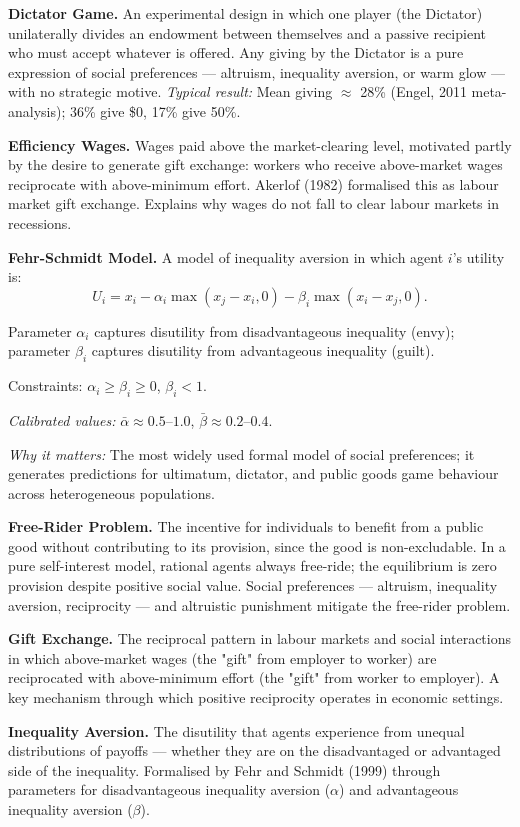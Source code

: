 \documentclass[12pt, letterpaper]{article}
\begin{document}
\textbf{Dictator Game.} An experimental design in which one player (the Dictator) unilaterally divides an endowment between themselves and a passive recipient who must accept whatever is offered. Any giving by the Dictator is a pure expression of social preferences --- altruism, inequality aversion, or warm glow --- with no strategic motive. \textit{Typical result:} Mean giving $\approx$ 28\% (Engel, 2011 meta-analysis); 36\% give \$0, 17\% give 50\%.

\textbf{Efficiency Wages.} Wages paid above the market-clearing level, motivated partly by the desire to generate gift exchange: workers who receive above-market wages reciprocate with above-minimum effort. Akerlof (1982) formalised this as labour market gift exchange. Explains why wages do not fall to clear labour markets in recessions.

\textbf{Fehr-Schmidt Model.} A model of inequality aversion in which agent $i$'s utility is:
\[
U_i = x_i - \alpha_i \max(x_j - x_i, 0) - \beta_i \max(x_i - x_j, 0).
\]

Parameter $\alpha_i$ captures disutility from disadvantageous inequality (envy); parameter $\beta_i$ captures disutility from advantageous inequality (guilt).

Constraints: $\alpha_i \geq \beta_i \geq 0$, $\beta_i < 1$.

\textit{Calibrated values:} $\bar{\alpha} \approx 0.5$--$1.0$, $\bar{\beta} \approx 0.2$--$0.4$.

\textit{Why it matters:} The most widely used formal model of social preferences; it generates predictions for ultimatum, dictator, and public goods game behaviour across heterogeneous populations.

\textbf{Free-Rider Problem.} The incentive for individuals to benefit from a public good without contributing to its provision, since the good is non-excludable. In a pure self-interest model, rational agents always free-ride; the equilibrium is zero provision despite positive social value. Social preferences --- altruism, inequality aversion, reciprocity --- and altruistic punishment mitigate the free-rider problem.

\textbf{Gift Exchange.} The reciprocal pattern in labour markets and social interactions in which above-market wages (the "gift" from employer to worker) are reciprocated with above-minimum effort (the "gift" from worker to employer). A key mechanism through which positive reciprocity operates in economic settings.

\textbf{Inequality Aversion.} The disutility that agents experience from unequal distributions of payoffs --- whether they are on the disadvantaged or advantaged side of the inequality. Formalised by Fehr and Schmidt (1999) through parameters for disadvantageous inequality aversion ($\alpha$) and advantageous inequality aversion ($\beta$).
\end{document}
